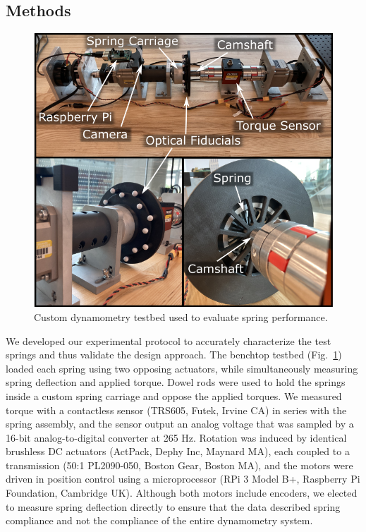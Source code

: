 \documentclass[letterpaper, 10 pt, conference]{ieeeconf} %
\begin{document}
\subsection{Methods}
\begin{figure}[b!]
    \centering
    \includegraphics[width=\columnwidth]{figs/testbed.png}
    \caption{Custom dynamometry testbed used to evaluate spring performance.}
    \label{fig:testbed}
\end{figure}
We developed our experimental protocol to accurately characterize the test springs and thus validate the design approach. The benchtop testbed (Fig.~\ref{fig:testbed}) loaded each spring using two opposing actuators, while simultaneously measuring spring deflection and applied torque. Dowel rods were used to hold the springs inside a custom spring carriage and oppose the applied torques. We measured torque with a contactless sensor (TRS605, Futek, Irvine CA) in series with the spring assembly, and the sensor output an analog voltage that was sampled by a 16-bit analog-to-digital converter at 265 Hz. Rotation was induced by identical brushless DC actuators (ActPack, Dephy Inc, Maynard MA), each coupled to a transmission (50:1 PL2090-050, Boston Gear, Boston MA), and the motors were driven in position control using a microprocessor (RPi 3 Model B+, Raspberry Pi Foundation, Cambridge UK). Although both motors include encoders, we elected to measure spring deflection directly to ensure that the data described spring compliance and not the compliance of the entire dynamometry system.
\end{document}
